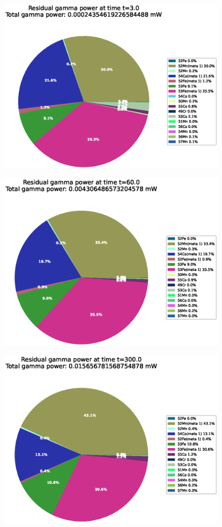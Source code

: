 \FloatBarrier


\begin{figure}[!htb]
\centering
\includegraphics[width=0.8\linewidth]{chapters/activity_code/fe-activity-v2/residual-energy/0001_3.eps}
\caption{}
\label{fig:activity-v2-residual-power-3s}
\end{figure}

\begin{figure}[!htb]
\centering
\includegraphics[width=0.8\linewidth]{chapters/activity_code/fe-activity-v2/residual-energy/0020_60.eps}
\caption{}
\label{fig:activity-v2-residual-power-60s}
\end{figure}

\begin{figure}[!htb]
\centering
\includegraphics[width=0.8\linewidth]{chapters/activity_code/fe-activity-v2/residual-energy/0100_300.eps}
\caption{}
\label{fig:activity-v2-residual-power-300s}
\end{figure}

